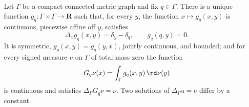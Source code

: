 \begin{lemma}
\label{lem:ch31-green-kernel}
Let \(\Gamma\) be a compact connected metric graph and fix \(q\in\Gamma\).
There is a unique function \(g_q:\Gamma\times\Gamma\to\mathbf R\) such that,
for every \(y\), the function \(x\mapsto g_q(x,y)\) is continuous, piecewise
affine off \(y\), satisfies
\begin{equation}
\label{eq:ch31-green-kernel}
 \Delta_xg_q(x,y)=\delta_y-\delta_q,
 \qquad g_q(q,y)=0 .
\end{equation}
It is symmetric, \(g_q(x,y)=g_q(y,x)\), jointly continuous, and bounded;
and for every signed measure \(\nu\) on \(\Gamma\) of total mass zero the
function
\begin{equation}
\label{eq:ch31-green-potential}
 G_q\nu(x)=\int_\Gamma g_q(x,y)\,\rd\nu(y)
\end{equation}
is continuous and satisfies \(\Delta_\Gamma G_q\nu=\nu\).  Two solutions of
\(\Delta_\Gamma u=\nu\) differ by a constant.
\end{lemma}

